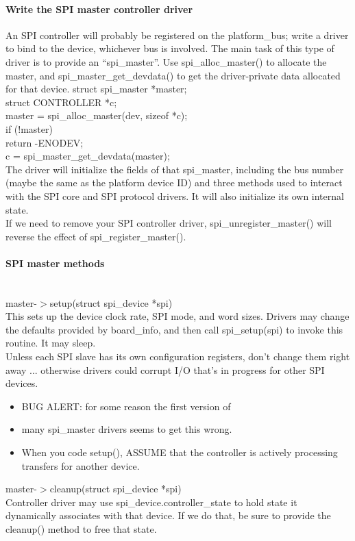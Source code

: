 \paragraph{Write the SPI master controller driver}
An SPI controller will probably be registered on the platform\_bus; write a driver to bind to the device, whichever bus is involved. The main task of this type of driver is to provide an ``spi\_master''.
Use spi\_alloc\_master() to allocate the master, and spi\_master\_get\_devdata() to get the driver-private data allocated for that device.
	struct spi\_master	*master;\\
	struct CONTROLLER	*c;\\
	master = spi\_alloc\_master(dev, sizeof *c);\\
			if (!master)\\
			return -ENODEV;\\
			c = spi\_master\_get\_devdata(master);\\
The driver will initialize the fields of that spi\_master, including the bus number (maybe the same as the platform device ID) and three methods used to interact with the SPI core and SPI protocol drivers.  It will also initialize its own internal state.\\
If we need to remove your SPI controller driver, spi\_unregister\_master() will reverse the effect of spi\_register\_master().
\paragraph{SPI master methods}\\
master-$>$setup(struct spi\_device *spi)\\
This sets up the device clock rate, SPI mode, and word sizes. Drivers may change the defaults provided by board\_info, and then call spi\_setup(spi) to invoke this routine.  It may sleep.\\
Unless each SPI slave has its own configuration registers, don't change them right away ... otherwise drivers could corrupt I/O that's in progress for other SPI devices.
\begin{itemize}
	\item BUG ALERT:  for some reason the first version of
	\item many spi\_master drivers seems to get this wrong.
	\item When you code setup(), ASSUME that the controller is actively processing transfers for another device.
\end{itemize}
master-$>$cleanup(struct spi\_device *spi) \\
	Controller driver may use spi\_device.controller\_state to hold
		state it dynamically associates with that device.  If we do that,
			be sure to provide the cleanup() method to free that state.\\

